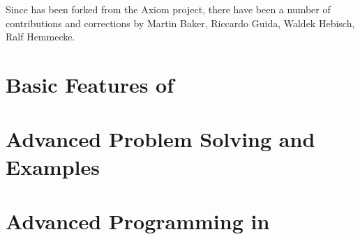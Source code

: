 \documentclass[twoside,a4paper]{book}
\begin{document}
Since \Language{} has been forked from the Axiom project, there have
been a number of contributions and corrections by Martin Baker,
Riccardo Guida, Waldek Hebisch, Ralf Hemmecke.


%
%
\clearpage

\tableofcontents
%
%
\setcounter{chapter}{-1}


\part{Basic Features of \Language{}}
%







\begingroup
\let\spaddescriptionsave\description
\def\description{\def\spadfun{\textspadfun}\spaddescriptionsave}

\endgroup

\part{Advanced Problem Solving and Examples}
%



\part{Advanced Programming in \Language{}}
%






%
\appendix


%
%
%
%

%
\printindex
\end{document}
